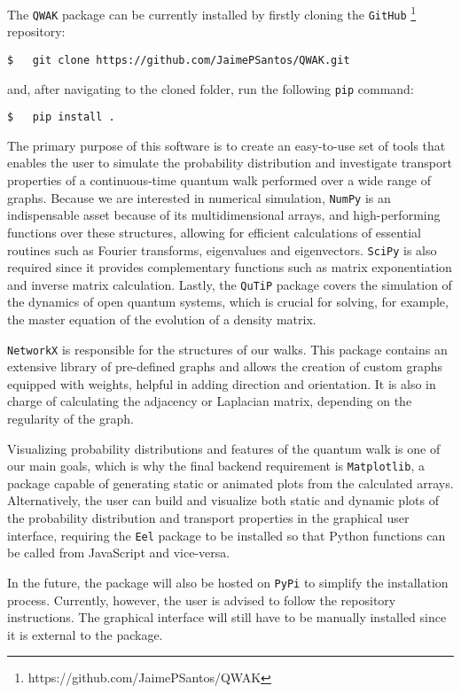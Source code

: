 \documentclass[main.tex]{subfiles}
\begin{document}
The \texttt{QWAK} package can be currently installed by firstly cloning the
\texttt{GitHub} \footnote{https://github.com/JaimePSantos/QWAK} repository:

\begin{lstlisting}[style=commands]
$   git clone https://github.com/JaimePSantos/QWAK.git 
\end{lstlisting}
and, after navigating to the cloned folder, run the following \texttt{pip}
command: 
\begin{lstlisting}[style=commands]
$   pip install .
\end{lstlisting}

The primary purpose of this software is to create an easy-to-use set of tools
that enables the user to simulate the probability distribution and investigate
transport properties of a continuous-time quantum walk performed over a wide
range of graphs. Because we are interested in numerical simulation,
\texttt{NumPy} is an indispensable asset because of its multidimensional
arrays, and high-performing functions over these structures, allowing for
efficient calculations of essential routines such as Fourier transforms,
eigenvalues and eigenvectors. \texttt{SciPy} is also required since it provides
complementary functions such as matrix exponentiation and inverse matrix
calculation. Lastly, the \texttt{QuTiP} package covers the simulation of the
dynamics of open quantum systems, which is crucial for solving, for example,
the master equation of the evolution of a density matrix.\par

\texttt{NetworkX} is responsible for the structures of our walks. This package
contains an extensive library of pre-defined graphs and allows the
creation of custom graphs equipped with weights, helpful in adding direction
and orientation. It is also in charge of calculating the adjacency or Laplacian
matrix, depending on the regularity of the graph.\par

Visualizing probability distributions and features of the quantum walk is one
of our main goals, which is why the final backend requirement is
\texttt{Matplotlib}, a package capable of generating static or animated plots
from the calculated arrays. Alternatively, the user can build and visualize
both static and dynamic plots of the probability distribution and transport
properties in the graphical user interface, requiring the \texttt{Eel} package
to be installed so that Python functions can be called from
JavaScript and vice-versa.\par

In the future, the package will also be hosted on \texttt{PyPi} to
simplify the installation process. Currently, however, the user is advised to
follow the repository instructions. The graphical interface will still have to
be manually installed since it is external to the package.
\end{document}
